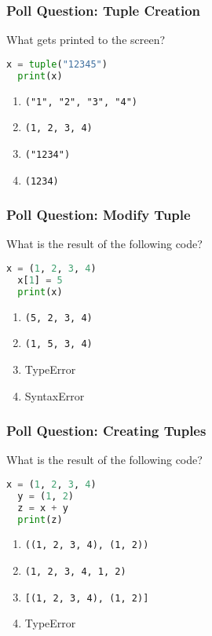 \documentclass{beamer}
\begin{document}
%
%
\begin{frame}[fragile]
  \frametitle{Poll Question: Tuple Creation}
  What gets printed to the screen?
  \begin{lstlisting}[language=Python, autogobble]
  x = tuple("12345")
  print(x)
  \end{lstlisting}
  \vfill
  \begin{enumerate}[A] 
    \item \lstinline|("1", "2", "3", "4")|
    \item \lstinline|(1, 2, 3, 4)|
    \item \lstinline|("1234")|
    \item \lstinline|(1234)|
  \end{enumerate}
\end{frame}


%
%
\begin{frame}[fragile]
  \frametitle{Poll Question: Modify Tuple}
  What is the result of the following code?
  \begin{lstlisting}[language=Python, autogobble]
  x = (1, 2, 3, 4)
  x[1] = 5
  print(x)
  \end{lstlisting}
  \vfill
  \begin{enumerate}[A] 
    \item \lstinline|(5, 2, 3, 4)|
    \item \lstinline|(1, 5, 3, 4)|
    \item TypeError
    \item SyntaxError
  \end{enumerate}
\end{frame}

%
%
\begin{frame}[fragile]
  \frametitle{Poll Question: Creating Tuples} 
  What is the result of the following code?
  \begin{lstlisting}[language=Python, autogobble]
  x = (1, 2, 3, 4)
  y = (1, 2)
  z = x + y
  print(z)
  \end{lstlisting}
  \vfill
  \begin{enumerate}[A] 
    \item \lstinline|((1, 2, 3, 4), (1, 2))|
    \item \lstinline|(1, 2, 3, 4, 1, 2)|
    \item \lstinline|[(1, 2, 3, 4), (1, 2)]|
    \item TypeError
  \end{enumerate}
\end{frame}
\end{document}
